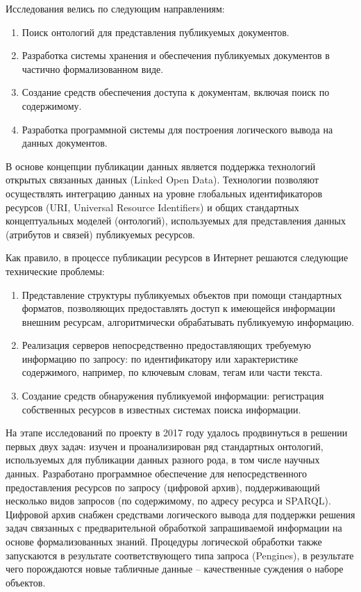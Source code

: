 \documentclass[a4paper,12pt,openany,final]{extreport}
\begin{document}
Исследования велись по следующим направлениям:

\begin{enumerate}
\def\labelenumi{\arabic{enumi}.}
\item
  Поиск онтологий для представления публикуемых документов.
\item
  Разработка системы хранения и обеспечения публикуемых документов в
  частично формализованном виде.
\item
  Создание средств обеспечения доступа к документам, включая поиск по
  содержимому.
\item
  Разработка программной системы для построения логического вывода на
  данных документов.
\end{enumerate}

В основе концепции публикации данных является поддержка технологий
открытых связанных данных (Linked Open Data). Технологии позволяют
осуществлять интеграцию данных на уровне глобальных идентификаторов
ресурсов (URI, Universal Resource Identifiers) и общих стандартных
концептуальных моделей (онтологий), используемых для представления
данных (атрибутов и связей) публикуемых ресурсов.

Как правило, в процессе публикации ресурсов в Интернет решаются
следующие технические проблемы:

\begin{enumerate}
\def\labelenumi{\arabic{enumi}.}
\item
  Представление структуры публикуемых объектов при помощи стандартных
  форматов, позволяющих предоставлять доступ к имеющейся информации
  внешним ресурсам, алгоритмически обрабатывать публикуемую информацию.
\item
  Реализация серверов непосредственно предоставляющих требуемую
  информацию по запросу: по идентификатору или характеристике
  содержимого, например, по ключевым словам, тегам или части текста.
\item
  Создание средств обнаружения публикуемой информации: регистрация
  собственных ресурсов в известных системах поиска информации.
\end{enumerate}

На этапе исследований по проекту в 2017 году удалось продвинуться в
решении первых двух задач: изучен и проанализирован ряд стандартных
онтологий, используемых для публикации данных разного рода, в том числе
научных данных. Разработано программное обеспечение для
непосредственного предоставления ресурсов по запросу (цифровой архив),
поддерживающий несколько видов запросов (по содержимому, по адресу
ресурса и SPARQL). Цифровой архив снабжен средствами логического вывода
для поддержки решения задач связанных с предварительной обработкой
запрашиваемой информации на основе формализованных знаний. Процедуры
логической обработки также запускаются в результате соответствующего
типа запроса (Pengines), в результате чего порождаются новые табличные
данные -- качественные суждения о наборе объектов.
\end{document}
